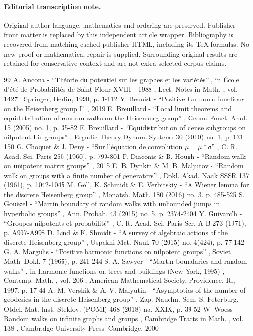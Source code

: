 \documentclass[11pt]{article}
\numberwithin{equation}{section}
\begin{document}
\paragraph{Editorial transcription note.}
Original author language, mathematics and ordering are preserved. Publisher front matter is replaced by this independent article wrapper. Bibliography is recovered from matching cached publisher HTML, including its TeX formulas. No new proof or mathematical repair is supplied. Surrounding original results are retained for conservative context and are not extra selected corpus claims.
\clearpage

\begin{thebibliography}{99}
 A. Ancona - “Théorie du potentiel sur les graphes et les variétés” , in École d’été de Probabilités de Saint-Flour XVIII—1988 , Lect. Notes in Math. , vol. 1427 , Springer, Berlin, 1990, p. 1-112
 Y. Benoist - “Positive harmonic functions on the Heisenberg group I” , 2019
 E. Breuillard - “Local limit theorems and equidistribution of random walks on the Heisenberg group” , Geom. Funct. Anal. 15 (2005) no. 1, p. 35-82
 E. Breuillard - “Equidistribution of dense subgroups on nilpotent Lie groups” , Ergodic Theory Dynam. Systems 30 (2010) no. 1, p. 131-150
 G. Choquet \& J. Deny - “Sur l’équation de convolution $\mu =\mu \ast \sigma $” , C. R. Acad. Sci. Paris 250 (1960), p. 799-801
 P. Diaconis \& B. Hough - “Random walk on unipotent matrix groups” , 2015
 E. B. Dynkin \& M. B. Maljutov - “Random walk on groups with a finite number of generators” , Dokl. Akad. Nauk SSSR 137 (1961), p. 1042-1045
 M. Göll, K. Schmidt \& E. Verbitskiy - “A Wiener lemma for the discrete Heisenberg group” , Monatsh. Math. 180 (2016) no. 3, p. 485-525
 S. Gouëzel - “Martin boundary of random walks with unbounded jumps in hyperbolic groups” , Ann. Probab. 43 (2015) no. 5, p. 2374-2404
 Y. Guivarc’h - “Groupes nilpotents et probabilité” , C. R. Acad. Sci. Paris Sér. A-B 273 (1971), p. A997-A998
 D. Lind \& K. Shmidt - “A survey of algebraic actions of the discrete Heisenberg group” , Uspekhi Mat. Nauk 70 (2015) no. 4(424), p. 77-142
 G. A. Margulis - “Positive harmonic functions on nilpotent groups” , Soviet Math. Dokl. 7 (1966), p. 241-244
 S. A. Sawyer - “Martin boundaries and random walks” , in Harmonic functions on trees and buildings (New York, 1995) , Contemp. Math. , vol. 206 , American Mathematical Society, Providence, RI, 1997, p. 17-44
 A. M. Vershik \& A. V. Malyutin - “Asymptotics of the number of geodesics in the discrete Heisenberg group” , Zap. Nauchn. Sem. S.-Peterburg. Otdel. Mat. Inst. Steklov. (POMI) 468 (2018) no. XXIX, p. 39-52
 W. Woess - Random walks on infinite graphs and groups , Cambridge Tracts in Math. , vol. 138 , Cambridge University Press, Cambridge, 2000
\end{thebibliography}
\end{document}
